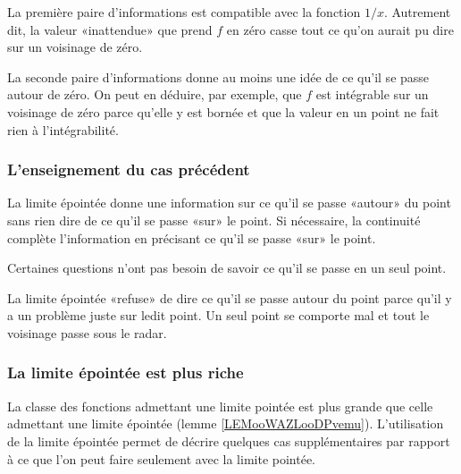 La première paire d'informations est compatible avec la fonction \( 1/x\). Autrement dit, la valeur «inattendue» que prend \( f\) en zéro casse tout ce qu'on aurait pu dire sur un voisinage de zéro.

La seconde paire d'informations donne au moins une idée de ce qu'il se passe autour de zéro. On peut en déduire, par exemple, que \( f\) est intégrable sur un voisinage de zéro parce qu'elle y est bornée et que la valeur en un point ne fait rien à l'intégrabilité.

\subsubsection{L'enseignement du cas précédent}

La limite épointée donne une information sur ce qu'il se passe «autour» du point sans rien dire de ce qu'il se passe «sur» le point. Si nécessaire, la continuité complète l'information en précisant ce qu'il se passe «sur» le point.

Certaines questions n'ont pas besoin de savoir ce qu'il se passe en un seul point.

La limite épointée «refuse» de dire ce qu'il se passe autour du point parce qu'il y a un problème juste sur ledit point. Un seul point se comporte mal et tout le voisinage passe sous le radar.

\subsubsection{La limite épointée est plus riche}

La classe des fonctions admettant une limite pointée est plus grande que celle admettant une limite épointée (lemme \ref{LEMooWAZLooDPvemu}). L'utilisation de la limite épointée permet de décrire quelques cas supplémentaires par rapport à ce que l'on peut faire seulement avec la limite pointée.


